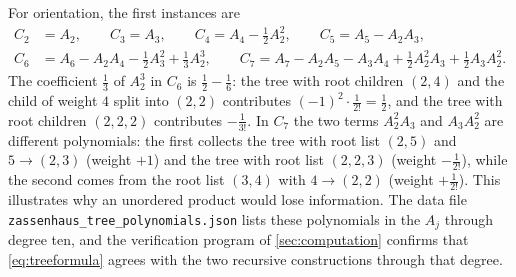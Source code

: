 For orientation, the first instances are
\begin{equation}\label{eq:CinA}
\begin{aligned}
 C_2&=A_2,\qquad C_3=A_3,\qquad C_4=A_4-\tfrac12A_2^2,\qquad
 C_5=A_5-A_2A_3,\\
 C_6&=A_6-A_2A_4-\tfrac12A_3^2+\tfrac13A_2^3,\qquad
 C_7=A_7-A_2A_5-A_3A_4+\tfrac12A_2^2A_3+\tfrac12A_3A_2^2.
\end{aligned}
\end{equation}
The coefficient $\tfrac13$ of $A_2^3$ in $C_6$ is
$\tfrac12-\tfrac16$: the tree with root children $(2,4)$ and the child of
weight $4$ split into $(2,2)$ contributes $(-1)^2\cdot\frac1{2!}=\frac12$,
and the tree with root children $(2,2,2)$ contributes $-\frac1{3!}$. In
$C_7$ the two terms $A_2^2A_3$ and $A_3A_2^2$ are different polynomials:
the first collects the tree with root list $(2,5)$ and $5\to(2,3)$
(weight $+1$) and the tree with root list $(2,2,3)$ (weight $-\tfrac1{2!}$),
while the second comes from the root list $(3,4)$ with $4\to(2,2)$
(weight $+\tfrac1{2!}$). This illustrates why an unordered product would
lose information. The data file \texttt{zassenhaus\_tree\_polynomials.json}
lists these polynomials in the $A_j$ through degree ten, and the
verification program of \cref{sec:computation} confirms that
\eqref{eq:treeformula} agrees with the two recursive constructions through
that degree.

